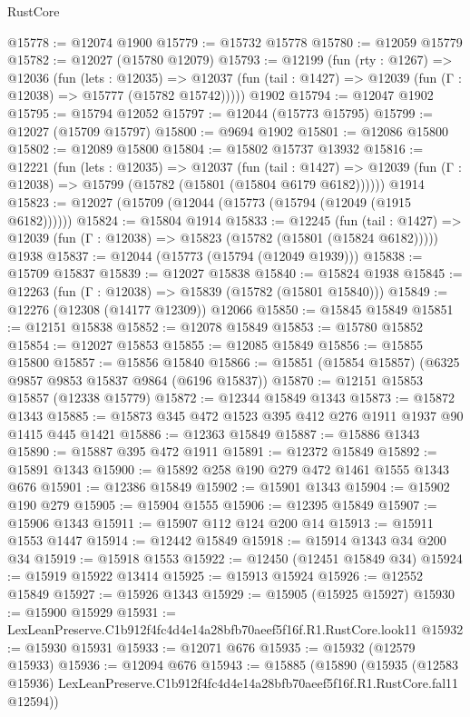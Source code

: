 \begin{lexlean}{RustCore}
\begin{coremodule}
@15778 := @12074 @1900
@15779 := @15732 @15778
@15780 := @12059 @15779
@15782 := @12027 (@15780 @12079)
@15793 := @12199
    (fun (rty : @1267) =>
    @12036
      (fun (lets : @12035) =>
      @12037 (fun (tail : @1427) => @12039 (fun (Γ : @12038) => @15777 (@15782 @15742)))))
    @1902
@15794 := @12047 @1902
@15795 := @15794 @12052
@15797 := @12044 (@15773 @15795)
@15799 := @12027 (@15709 @15797)
@15800 := @9694 @1902
@15801 := @12086 @15800
@15802 := @12089 @15800
@15804 := @15802 @15737 @13932
@15816 := @12221
    (fun (lets : @12035) =>
    @12037
      (fun (tail : @1427) =>
      @12039 (fun (Γ : @12038) => @15799 (@15782 (@15801 (@15804 @6179 @6182))))))
    @1914
@15823 := @12027 (@15709 (@12044 (@15773 (@15794 (@12049 (@1915 @6182))))))
@15824 := @15804 @1914
@15833 := @12245
    (fun (tail : @1427) => @12039 (fun (Γ : @12038) => @15823 (@15782 (@15801 (@15824 @6182)))))
    @1938
@15837 := @12044 (@15773 (@15794 (@12049 @1939)))
@15838 := @15709 @15837
@15839 := @12027 @15838
@15840 := @15824 @1938
@15845 := @12263 (fun (Γ : @12038) => @15839 (@15782 (@15801 @15840)))
@15849 := @12276 (@12308 (@14177 @12309)) @12066
@15850 := @15845 @15849
@15851 := @12151 @15838
@15852 := @12078 @15849
@15853 := @15780 @15852
@15854 := @12027 @15853
@15855 := @12085 @15849
@15856 := @15855 @15800
@15857 := @15856 @15840
@15866 := @15851 (@15854 @15857) (@6325 @9857 @9853 @15837 @9864 (@6196 @15837))
@15870 := @12151 @15853 @15857 (@12338 @15779)
@15872 := @12344 @15849 @1343
@15873 := @15872 @1343
@15885 := @15873 @345 @472 @1523 @395 @412 @276 @1911 @1937 @90 @1415 @445 @1421
@15886 := @12363 @15849
@15887 := @15886 @1343
@15890 := @15887 @395 @472 @1911
@15891 := @12372 @15849
@15892 := @15891 @1343
@15900 := @15892 @258 @190 @279 @472 @1461 @1555 @1343 @676
@15901 := @12386 @15849
@15902 := @15901 @1343
@15904 := @15902 @190 @279
@15905 := @15904 @1555
@15906 := @12395 @15849
@15907 := @15906 @1343
@15911 := @15907 @112 @124 @200 @14
@15913 := @15911 @1553 @1447
@15914 := @12442 @15849
@15918 := @15914 @1343 @34 @200 @34
@15919 := @15918 @1553
@15922 := @12450 (@12451 @15849 @34)
@15924 := @15919 @15922 @13414
@15925 := @15913 @15924
@15926 := @12552 @15849
@15927 := @15926 @1343
@15929 := @15905 (@15925 @15927)
@15930 := @15900 @15929
@15931 := LexLeanPreserve.C1b912f4fc4d4e14a28bfb70aeef5f16f.R1.RustCore.look11
@15932 := @15930 @15931
@15933 := @12071 @676
@15935 := @15932 (@12579 @15933)
@15936 := @12094 @676
@15943 := @15885
    (@15890
      (@15935
        (@12583 @15936)
        LexLeanPreserve.C1b912f4fc4d4e14a28bfb70aeef5f16f.R1.RustCore.fal11
        @12594))

\end{coremodule}
\end{lexlean}
